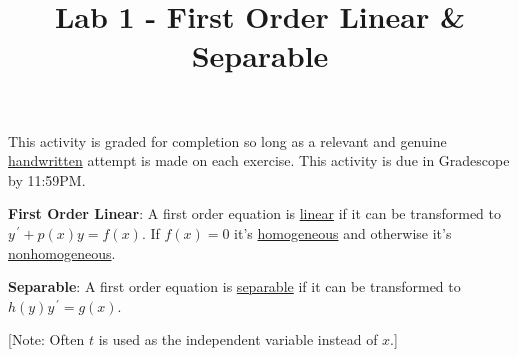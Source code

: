 \documentclass{ximera}
\begin{document}
\begin{abstract}
 \end{abstract}

    \title{Lab 1 - First Order Linear \& Separable}
    
    \maketitle

This activity is graded for completion so long as a relevant and genuine \underline{handwritten} attempt is made on each exercise.  This activity is due in Gradescope by 11:59PM.


\textbf{First Order Linear}:  A first order equation is \underline{linear} if it can be transformed to \\ $y^{\,\prime}+p(x)y=f(x)$.  If $f(x)=0$ it's \underline{homogeneous} and otherwise it's \underline{nonhomogeneous}.

\textbf{Separable}:  A first order equation is \underline{separable} if it can be transformed to $h(y)y^{\,\prime}=g(x)$.

[Note: Often $t$ is used as the independent variable instead of $x$.]
\end{document}
